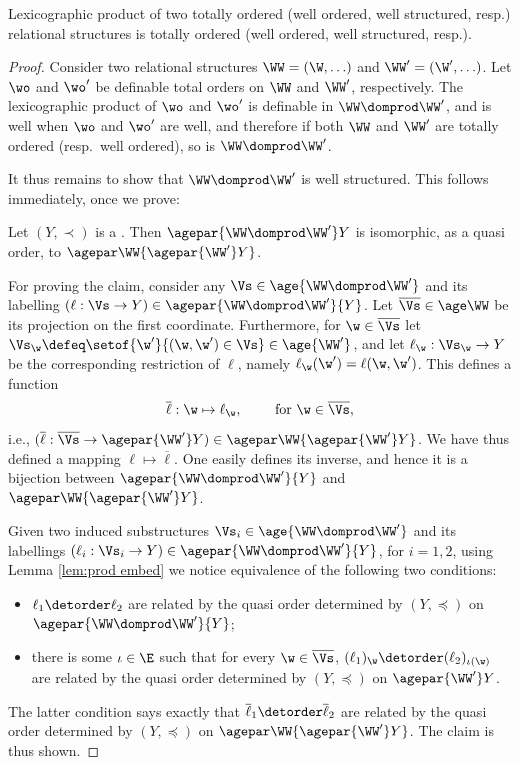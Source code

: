 \begin{lemmarep} \label{lem:prod}
Lexicographic product of two totally ordered (well ordered, well structured, resp.) relational structures is 
totally ordered (well ordered, well structured, resp.).
\end{lemmarep}
%
\begin{proof}
Consider two relational structures $\WW = (\W, \ldots)$ and $\WW' = (\W', \ldots)$.
Let $\wo$ and $\wo'$ be definable total orders on $\WW$ and $\WW'$, respectively.
The lexicographic product of $\wo$ and $\wo'$ is definable in $\WW \domprod \WW'$,
and is well when $\wo$ and $\wo'$ are well, and therefore
if both $\WW$ and $\WW'$ are totally ordered (resp.~well ordered), so is $\WW \domprod \WW'$.

It thus remains to show that $\WW \domprod \WW'$ is well structured.
This follows immediately, once we prove:

\begin{claim}  \label{claim:wqo emb}
Let $(Y, \prec)$ is a \wqo.
Then $\agepar {\WW \domprod \WW'} Y$ is isomorphic, as a quasi order, 
to $\agepar \WW {\agepar {\WW'} Y}$.
\end{claim}
%
For proving the claim,
consider any $\Vs \in \age {\WW \domprod \WW'}$
and its labelling $(\ell : \Vs \to Y) \in \agepar{\WW\domprod\WW'}{Y}$.
Let $\overline\Vs \in\age \WW$ be its projection 
on the first coordinate.
Furthermore, for $\w\in\overline\Vs$ let 
$\Vs_\w \defeq \setof{\w'}{(\w,\w')\in\Vs}\in \age {\WW'}$, and let $\ell_\w : \Vs_\w \to Y$ be the
corresponding restriction of $\ell$, namely $\ell_\w(\w') = \ell(\w,\w')$.
This defines a function
\[
\overline\ell : \w \mapsto \ell_\w, \qquad
\text{ for } \w \in \overline\Vs,
\]
i.e.,
$(\overline \ell : \overline\Vs \to \agepar {\WW'} Y) \in \agepar \WW {\agepar {\WW'} Y}$.
We have thus defined a mapping $\ell \mapsto \overline\ell$.
One easily defines its inverse, and hence it
is a bijection between
$\agepar{\WW\domprod\WW'}{Y}$ and $\agepar \WW {\agepar {\WW'} Y}$.

Given two induced substructures
$\Vs_i \in \age {\WW \domprod \WW'}$
and its labellings
$(\ell_i : \Vs_i \to Y) \in \agepar{\WW\domprod\WW'}{Y}$, for $i = 1, 2$,
using Lemma \ref{lem:prod embed} we notice equivalence of the following two conditions:
%
\begin{itemize}
\item
$\ell_1 \detorder \ell_2$ are related by the quasi order determined  by $(Y,\preceq)$
on $\agepar{\WW\domprod\WW'}{Y}$;
\item
there is some $\iota\in\E$ such that
for every $\w\in\overline\Vs$, $(\ell_1)_\w \detorder (\ell_2)_{\iota(\w)}$ are related
by the quasi order determined by $(Y, \preceq)$ on $\agepar {\WW'} Y$.
\end{itemize}
%
The latter condition says exactly that $\overline\ell_1 \detorder \overline\ell_2$ are related
by the quasi order determined by $(Y, \preceq)$ on $\agepar \WW {\agepar {\WW'} Y}$.
The claim is thus shown.
\end{proof}

